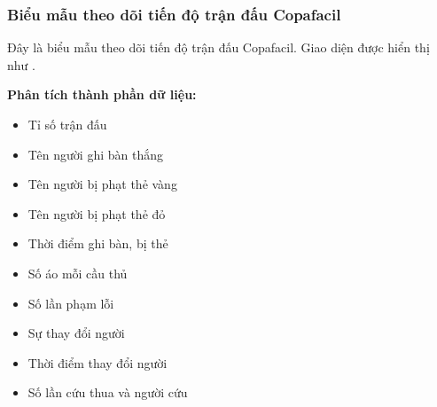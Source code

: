 \subsubsection{Biểu mẫu theo dõi tiến độ trận đấu Copafacil}

Đây là biểu mẫu theo dõi tiến độ trận đấu Copafacil.
Giao diện được hiển thị như .

\noindent
\textbf{Phân tích thành phần dữ liệu:}
\begin{itemize}[leftmargin=1.5cm, label={--}]
  \item Tỉ số trận đấu
  \item Tên người ghi bàn thắng
  \item Tên người bị phạt thẻ vàng
  \item Tên người bị phạt thẻ đỏ
  \item Thời điểm ghi bàn, bị thẻ
  \item Số áo mỗi cầu thủ
  \item Số lần phạm lỗi
  \item Sự thay đổi người
  \item Thời điểm thay đổi người
  \item Số lần cứu thua và người cứu

\end{itemize}
